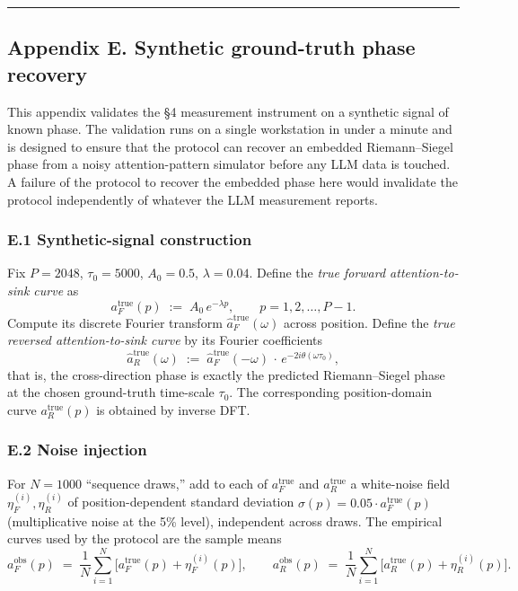 \documentclass[
  letterpaper,
  11pt]{article}
\theoremstyle{plain}
\theoremstyle{definition}
\theoremstyle{remark}
\begin{document}
\begin{center}\rule{0.5\linewidth}{0.5pt}\end{center}

\subsection{Appendix E. Synthetic ground-truth phase recovery}\label{appendix-e.-synthetic-ground-truth-phase-recovery}

This appendix validates the §4 measurement instrument on a synthetic signal of known phase. The validation runs on a single workstation in under a minute and is designed to ensure that the protocol can recover an embedded Riemann--Siegel phase from a noisy attention-pattern simulator before any LLM data is touched. A failure of the protocol to recover the embedded phase here would invalidate the protocol independently of whatever the LLM measurement reports.

\subsubsection{E.1 Synthetic-signal construction}\label{e.1-synthetic-signal-construction}

Fix \(P = 2048\), \(\tau_0 = 5000\), \(A_0 = 0.5\), \(\lambda = 0.04\). Define the \emph{true forward attention-to-sink curve} as
\[a_F^\text{true}(p) \;:=\; A_0\, e^{-\lambda p}, \qquad p = 1, 2, \ldots, P-1.\]
Compute its discrete Fourier transform \(\hat a_F^\text{true}(\omega)\) across position. Define the \emph{true reversed attention-to-sink curve} by its Fourier coefficients
\[\hat a_R^\text{true}(\omega) \;:=\; \hat a_F^\text{true}(-\omega)\,\cdot\,e^{-2i\theta(\omega \tau_0)},\]
that is, the cross-direction phase is exactly the predicted Riemann--Siegel phase at the chosen ground-truth time-scale \(\tau_0\). The corresponding position-domain curve \(a_R^\text{true}(p)\) is obtained by inverse DFT.

\subsubsection{E.2 Noise injection}\label{e.2-noise-injection}

For \(N = 1000\) ``sequence draws,'' add to each of \(a_F^\text{true}\) and \(a_R^\text{true}\) a white-noise field \(\eta_F^{(i)}, \eta_R^{(i)}\) of position-dependent standard deviation \(\sigma(p) = 0.05 \cdot a_F^\text{true}(p)\) (multiplicative noise at the 5\% level), independent across draws. The empirical curves used by the protocol are the sample means
\[a_F^\text{obs}(p) \;=\; \frac{1}{N}\sum_{i=1}^N \bigl[a_F^\text{true}(p) + \eta_F^{(i)}(p)\bigr], \qquad a_R^\text{obs}(p) \;=\; \frac{1}{N}\sum_{i=1}^N \bigl[a_R^\text{true}(p) + \eta_R^{(i)}(p)\bigr].\]
\end{document}
